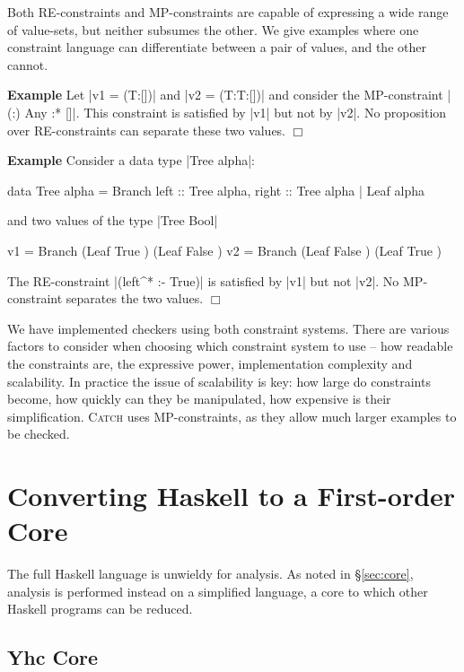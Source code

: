 \documentclass[preprint]{sigplanconf}
\newcommand{\catch}{\textsc{Catch}}
\newcommand{\newtool}{\anon{\catch07}{\catch}}
\newcounter{exmp}
\newcommand{\yesexample}{\addtocounter{exmp}{1}\addvspace{2mm}\noindent\textbf{Example \arabic{exmp}}}
\newcommand{\noexample}{\hfill\ensuremath{\Box}\par\addvspace{2mm}}
\newcommand{\anon}[2]{#2}
\newenvironment{example}{\yesexample}{\noexample}
\begin{document}
Both RE-constraints and MP-constraints are capable of expressing a wide range of value-sets, but neither subsumes the other. We give examples where one constraint language can differentiate between a pair of values, and the other cannot.

\begin{example}
Let |v1 = (T:[])| and |v2 = (T:T:[])| and consider the MP-constraint |{(:) Any} :* {[]}|. This constraint is satisfied by |v1| but not by |v2|. No proposition over RE-constraints can separate these two values.
\end{example}

\begin{example}
Consider a data type |Tree alpha|:

\begin{code}
data Tree alpha  =  Branch {left :: Tree alpha, right :: Tree alpha}
                 |  Leaf alpha
\end{code}

\noindent and two values of the type |Tree Bool|

\begin{code}
v1 = Branch (Leaf True   ) (Leaf False  )
v2 = Branch (Leaf False  ) (Leaf True   )
\end{code}

\noindent The RE-constraint |(left^* :- True)| is satisfied by |v1| but not |v2|. No MP-constraint separates the two values.
\end{example}

We have implemented checkers using both constraint systems. There are various factors to consider when choosing which constraint system to use -- how readable the constraints are, the expressive power, implementation complexity and scalability. In practice the issue of scalability is key: how large do constraints become, how quickly can they be manipulated, how expensive is their simplification. \newtool{} uses MP-constraints, as they allow much larger examples to be checked.

\section{Converting Haskell to a First-order Core}
\label{sec:transform}

The full Haskell language is unwieldy for analysis. As noted in \S\ref{sec:core}, analysis is performed instead on a simplified language, a core to which other Haskell programs can be reduced.

\subsection{Yhc Core}
\end{document}
